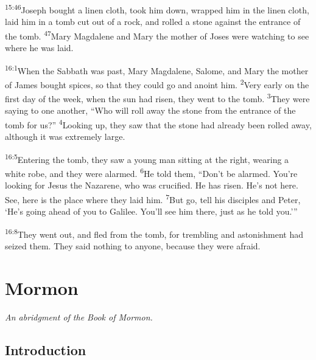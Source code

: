 \documentclass[openany,12pt,english]{book}
\newenvironment{para}{\par\pretolerance=100\tolerance=200\setlength{\emergencystretch}{0.6em}\relax}{\par}
\begin{document}
\begin{para}
    \textsuperscript{15:46}\thinspace{}Jo\-seph bought a lin\-en cloth, took him down, wrapped him in the lin\-en cloth, laid him in a tomb cut out of a rock, and rolled a stone against the en\-trance of the tomb.
    \textsuperscript{47}\thinspace{}Mar\-y Mag\-da\-lene and Mar\-y the moth\-er of Joses were watching to see where he was laid.
\end{para}

\bigskip{}

\begin{para}
    \textsuperscript{16:1}\thinspace{}When the Sabbath was past, Mar\-y Mag\-da\-lene, Salome, and Mar\-y the moth\-er of James bought spices, so that they could go and a\-noint him.
    \textsuperscript{2}\thinspace{}Ver\-y ear\-ly on the first day of the week, when the sun had ris\-en, they went to the tomb.
    \textsuperscript{3}\thinspace{}They were say\-ing to one an\-oth\-er, “Who will roll a\-way the stone from the en\-trance of the tomb for us?”
    \textsuperscript{4}\thinspace{}Looking up, they saw that the stone had al\-read\-y been rolled a\-way, al\-though it was ex\-treme\-ly large.
\end{para}

\begin{para}
    \textsuperscript{16:5}\thinspace{}Entering the tomb, they saw a young man sit\-ting at the right, wear\-ing a white robe, and they were alarmed.
    \textsuperscript{6}\thinspace{}He told them, “Don't be alarmed. You're looking for Jesus the Nazarene, who was cru\-ci\-fied. He has ris\-en. He's not here. See, here is the place where they laid him.
    \textsuperscript{7}\thinspace{}But go, tell his disciples and Pe\-ter, ‘He's go\-ing a\-head of you to Gal\-i\-lee. You'll see him there, just as he told you.’”
\end{para}

\begin{para}
    \textsuperscript{16:8}\thinspace{}They went out, and fled from the tomb, for trem\-bling and as\-ton\-ish\-ment had seized them. They said noth\-ing to any\-one, be\-cause they were a\-fraid.
\end{para}

\chapter*{Mormon}
\begin{changemargin}{.6in}{.6in}
  \begin{center}
    \itshape
    An a\-bridg\-ment of the Book of Mormon.
  \end{center}
\end{changemargin}
\section*{Introduction}
\end{document}
